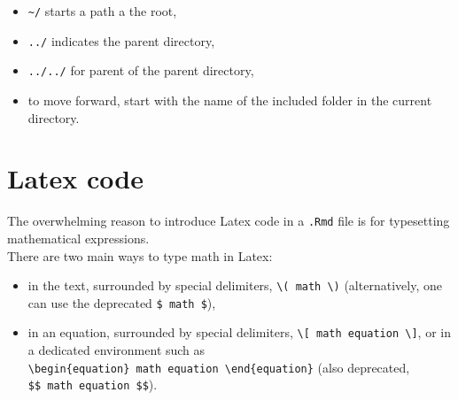 \documentclass[]{book}
\providecommand{\tightlist}{%
  \setlength{\itemsep}{0pt}\setlength{\parskip}{0pt}}
\theoremstyle{definition}
\theoremstyle{definition}
\theoremstyle{definition}
\theoremstyle{remark}
\begin{document}
\begin{itemize}
\tightlist
\item
  \texttt{\textasciitilde{}/} starts a path a the root,
\item
  \texttt{../} indicates the parent directory,
\item
  \texttt{../../} for parent of the parent directory,
\item
  to move forward, start with the name of the included folder in the
  current directory.
\end{itemize}

\hypertarget{latex}{%
\section{Latex code}\label{latex}}

The overwhelming reason to introduce Latex code in a \texttt{.Rmd} file
is for typesetting mathematical expressions.\\
There are two main ways to type math in Latex:

\begin{itemize}
\tightlist
\item
  in the text, surrounded by special delimiters,
  \texttt{\textbackslash{}(\ math\ \textbackslash{})} (alternatively,
  one can use the deprecated \texttt{\$\ math\ \$}),
\item
  in an equation, surrounded by special delimiters,
  \texttt{\textbackslash{}{[}\ math\ equation\ \textbackslash{}{]}}, or
  in a dedicated environment such as
  \texttt{\textbackslash{}begin\{equation\}\ math\ equation\ \textbackslash{}end\{equation\}}
  (also deprecated, \texttt{\$\$\ math\ equation\ \$\$}).
\end{itemize}
\end{document}
